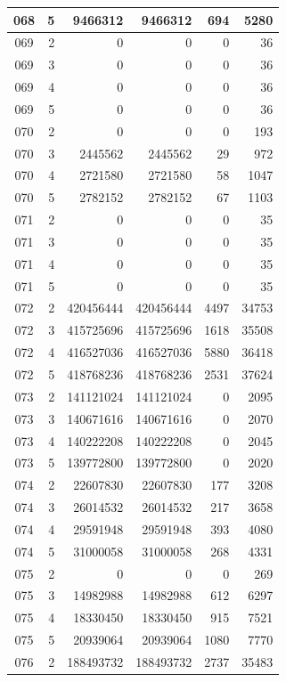 \begin{longtable}{|c|r|r|r|r|r|}
\hline
068 & 5 & 9466312 & 9466312 & 694 & 5280 \\
\hline
069 & 2 & 0 & 0 & 0 & 36 \\
\hline
069 & 3 & 0 & 0 & 0 & 36 \\
\hline
069 & 4 & 0 & 0 & 0 & 36 \\
\hline
069 & 5 & 0 & 0 & 0 & 36 \\
\hline
070 & 2 & 0 & 0 & 0 & 193 \\
\hline
070 & 3 & 2445562 & 2445562 & 29 & 972 \\
\hline
070 & 4 & 2721580 & 2721580 & 58 & 1047 \\
\hline
070 & 5 & 2782152 & 2782152 & 67 & 1103 \\
\hline
071 & 2 & 0 & 0 & 0 & 35 \\
\hline
071 & 3 & 0 & 0 & 0 & 35 \\
\hline
071 & 4 & 0 & 0 & 0 & 35 \\
\hline
071 & 5 & 0 & 0 & 0 & 35 \\
\hline
072 & 2 & 420456444 & 420456444 & 4497 & 34753 \\
\hline
072 & 3 & 415725696 & 415725696 & 1618 & 35508 \\
\hline
072 & 4 & 416527036 & 416527036 & 5880 & 36418 \\
\hline
072 & 5 & 418768236 & 418768236 & 2531 & 37624 \\
\hline
073 & 2 & 141121024 & 141121024 & 0 & 2095 \\
\hline
073 & 3 & 140671616 & 140671616 & 0 & 2070 \\
\hline
073 & 4 & 140222208 & 140222208 & 0 & 2045 \\
\hline
073 & 5 & 139772800 & 139772800 & 0 & 2020 \\
\hline
074 & 2 & 22607830 & 22607830 & 177 & 3208 \\
\hline
074 & 3 & 26014532 & 26014532 & 217 & 3658 \\
\hline
074 & 4 & 29591948 & 29591948 & 393 & 4080 \\
\hline
074 & 5 & 31000058 & 31000058 & 268 & 4331 \\
\hline
075 & 2 & 0 & 0 & 0 & 269 \\
\hline
075 & 3 & 14982988 & 14982988 & 612 & 6297 \\
\hline
075 & 4 & 18330450 & 18330450 & 915 & 7521 \\
\hline
075 & 5 & 20939064 & 20939064 & 1080 & 7770 \\
\hline
076 & 2 & 188493732 & 188493732 & 2737 & 35483 \\

\end{longtable}
